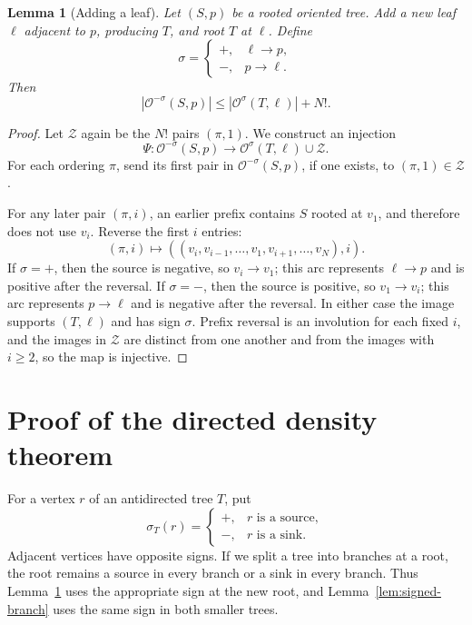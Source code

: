 \documentclass[11pt]{article}
\numberwithin{equation}{section}
\newtheorem{lemma}[theorem]{Lemma}
\theoremstyle{definition}
\newcommand{\cO}{\mathcal O}
\newcommand{\cZ}{\mathcal Z}
\begin{document}
\begin{lemma}[Adding a leaf]
\label{lem:signed-leaf}
Let $(S,p)$ be a rooted oriented tree.  Add a new leaf $\ell$ adjacent to
$p$, producing $T$, and root $T$ at $\ell$.  Define
\[
 \sigma=
 \begin{cases}
  +,&\ell\to p,\\
  -,&p\to\ell.
 \end{cases}
\]
Then
\begin{equation}
        |\cO^{-\sigma}(S,p)|
        \leq |\cO^\sigma(T,\ell)|+N!.
        \label{eq:signed-leaf}
\end{equation}
\end{lemma}

\begin{proof}
Let $\cZ$ again be the $N!$ pairs $(\pi,1)$.  We construct an injection
\[
 \Psi:\cO^{-\sigma}(S,p)
       \longrightarrow \cO^\sigma(T,\ell)\cup\cZ.
\]
For each ordering $\pi$, send its first pair in
$\cO^{-\sigma}(S,p)$, if one exists, to $(\pi,1)\in\cZ$.

For any later pair $(\pi,i)$, an earlier prefix contains $S$ rooted at
$v_1$, and therefore does not use $v_i$.  Reverse the first $i$ entries:
\begin{equation}
 (\pi,i)\longmapsto
 ((v_i,v_{i-1},\ldots,v_1,v_{i+1},\ldots,v_N),i).
 \label{eq:signed-reversal}
\end{equation}
If $\sigma=+$, then the source is
negative, so $v_i\to v_1$; this arc represents $\ell\to p$ and is positive
after the reversal.  If $\sigma=-$, then the source is positive, so
$v_1\to v_i$; this arc represents $p\to\ell$ and is negative after the
reversal.  In either case the image supports $(T,\ell)$ and has sign
$\sigma$.  Prefix reversal is an involution for each fixed $i$, and the
images in $\cZ$ are distinct from one another and from the images with
$i\geq2$, so the map is injective.
\end{proof}

\section{Proof of the directed density theorem}
\label{sec:density-proof}

For a vertex $r$ of an antidirected tree $T$, put
\[
 \sigma_T(r)=
 \begin{cases}
  +,&r\text{ is a source},\\
  -,&r\text{ is a sink}.
 \end{cases}
\]
Adjacent vertices have opposite signs.  If we split a tree into branches
at a root, the root remains a source in every branch or a sink in every
branch.  Thus Lemma~\ref{lem:signed-leaf} uses the appropriate sign
at the new root, and Lemma~\ref{lem:signed-branch} uses the same sign
in both smaller trees.
\end{document}
